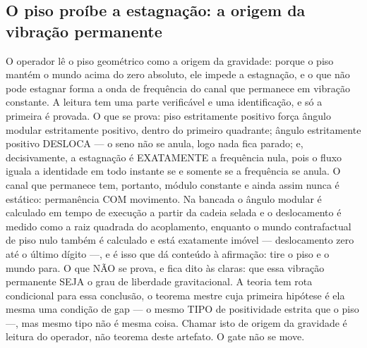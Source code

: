 \documentclass[11pt]{article}
\theoremstyle{definition}\newtheorem{deriv}{Derivação}
\begin{document}
\subsection*{O piso pro\'ibe a estagna\c{c}\~ao: a origem da vibra\c{c}\~ao permanente}O operador l\^e o piso geom\'etrico como a origem da gravidade: porque o piso mant\'em o mundo acima do zero absoluto, ele impede a estagna\c{c}\~ao, e o que n\~ao pode estagnar forma a onda de frequ\^encia do canal que permanece em vibra\c{c}\~ao constante. A leitura tem uma parte verific\'avel e uma identifica\c{c}\~ao, e s\'o a primeira \'e provada. O que se prova: piso estritamente positivo for\c{c}a \^angulo modular estritamente positivo, dentro do primeiro quadrante; \^angulo estritamente positivo DESLOCA --- o seno n\~ao se anula, logo nada fica parado; e, decisivamente, a estagna\c{c}\~ao \'e EXATAMENTE a frequ\^encia nula, pois o fluxo iguala a identidade em todo instante se e somente se a frequ\^encia se anula. O canal que permanece tem, portanto, m\'odulo constante e ainda assim nunca \'e est\'atico: perman\^encia COM movimento. Na bancada o \^angulo modular \'e calculado em tempo de execu\c{c}\~ao a partir da cadeia selada e o deslocamento \'e medido como a raiz quadrada do acoplamento, enquanto o mundo contrafactual de piso nulo tamb\'em \'e calculado e est\'a exatamente im\'ovel --- deslocamento zero at\'e o \'ultimo d\'igito ---, e \'e isso que d\'a conte\'udo \`a afirma\c{c}\~ao: tire o piso e o mundo para. O que N\~AO se prova, e fica dito \`as claras: que essa vibra\c{c}\~ao permanente SEJA o grau de liberdade gravitacional. A teoria tem rota condicional para essa conclus\~ao, o teorema mestre cuja primeira hip\'otese \'e ela mesma uma condi\c{c}\~ao de gap --- o mesmo TIPO de positividade estrita que o piso ---, mas mesmo tipo n\~ao \'e mesma coisa. Chamar isto de origem da gravidade \'e leitura do operador, n\~ao teorema deste artefato. O gate n\~ao se move.
\end{document}
